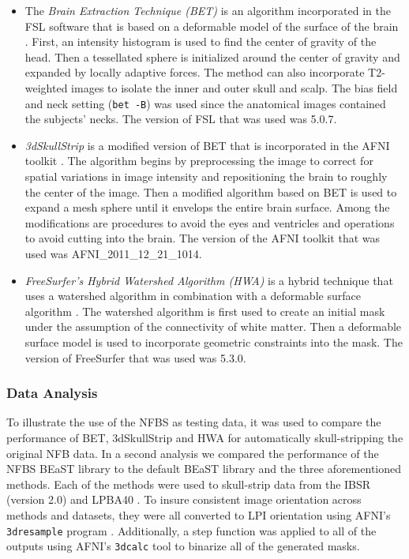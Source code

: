 \documentclass{bmcart}
\begin{document}
\begin{itemize}
    \item The \emph{Brain Extraction Technique (BET)} is an algorithm incorporated in the FSL software that is based on a deformable model of the surface of the brain \cite{Smith2002}. First, an intensity histogram is used to find the center of gravity of the head. Then a tessellated sphere is initialized around the center of gravity and expanded by locally adaptive forces. The method can also incorporate T2-weighted images to isolate the inner and outer skull and scalp. The bias field and neck setting ({\tt bet -B}) was used since the anatomical images contained the subjects' necks. The version of FSL that was used was 5.0.7.
    
    \item \emph{3dSkullStrip} is a modified version of BET that is incorporated in the AFNI toolkit \cite{afni}. The algorithm begins by preprocessing the image to correct for spatial variations in image intensity and repositioning the brain to roughly the center of the image. Then a modified algorithm based on BET is used to expand a mesh sphere until it envelops the entire brain surface. Among the modifications are procedures to avoid the eyes and ventricles and operations to avoid cutting into the brain. The version of the AFNI toolkit that was used was AFNI\_2011\_12\_21\_1014. 
    
    \item \emph{FreeSurfer's Hybrid Watershed Algorithm (HWA)} is a hybrid technique that uses a watershed algorithm in combination with a deformable surface algorithm \cite{Segonne2004}. The watershed algorithm is first used to create an initial mask under the assumption of the connectivity of white matter. Then a deformable surface model is used to incorporate geometric constraints into the mask. The version of FreeSurfer that was used was 5.3.0.
\end{itemize}

 

\subsubsection*{Data Analysis}

To illustrate the use of the NFBS as testing data, it was used to compare the performance of BET, 3dSkullStrip and HWA for automatically skull-stripping the original NFB data. In a second analysis we compared the performance of the NFBS BEaST library to the default BEaST library and the three aforementioned methods. Each of the methods were used to skull-strip data from the IBSR (version 2.0) and LPBA40 \cite{IBSR, lpba40}. To insure consistent image orientation across methods and datasets, they were all converted to LPI orientation using AFNI's \texttt{3dresample} program \cite{afni}. Additionally, a step function was applied to all of the outputs using AFNI's \texttt{3dcalc} tool to binarize all of the generated masks.
\end{document}

